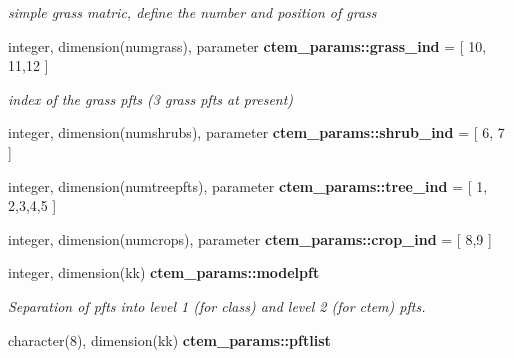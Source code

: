 \begin{DoxyCompactItemize}
\begin{DoxyCompactList}\small\item\em simple grass matric, define the number and position of grass \end{DoxyCompactList}\item 
\hypertarget{namespacectem__params_ac0e6330dd6b8408f75fb25c1a7aa7fcb}{}integer, dimension(numgrass), parameter {\bfseries ctem\+\_\+params\+::grass\+\_\+ind} = \mbox{[} 10, 11,12 \mbox{]}\label{namespacectem__params_ac0e6330dd6b8408f75fb25c1a7aa7fcb}

\begin{DoxyCompactList}\small\item\em index of the grass pfts (3 grass pfts at present) \end{DoxyCompactList}\item 
\hypertarget{namespacectem__params_aec72ba91dc7f74a089a1dfd41f940640}{}integer, dimension(numshrubs), parameter {\bfseries ctem\+\_\+params\+::shrub\+\_\+ind} = \mbox{[} 6, 7 \mbox{]}\label{namespacectem__params_aec72ba91dc7f74a089a1dfd41f940640}

\item 
\hypertarget{namespacectem__params_a0e1c44fcb6eedc488eba03f610e542dd}{}integer, dimension(numtreepfts), parameter {\bfseries ctem\+\_\+params\+::tree\+\_\+ind} = \mbox{[} 1, 2,3,4,5 \mbox{]}\label{namespacectem__params_a0e1c44fcb6eedc488eba03f610e542dd}

\item 
\hypertarget{namespacectem__params_acc6cbb656e34f04ef6d29df9e3418bb3}{}integer, dimension(numcrops), parameter {\bfseries ctem\+\_\+params\+::crop\+\_\+ind} = \mbox{[} 8,9 \mbox{]}\label{namespacectem__params_acc6cbb656e34f04ef6d29df9e3418bb3}

\item 
\hypertarget{namespacectem__params_a76e98194cd4666e7ca87bc867c1ba680}{}integer, dimension(kk) {\bfseries ctem\+\_\+params\+::modelpft}\label{namespacectem__params_a76e98194cd4666e7ca87bc867c1ba680}

\begin{DoxyCompactList}\small\item\em Separation of pfts into level 1 (for class) and level 2 (for ctem) pfts. \end{DoxyCompactList}\item 
\hypertarget{namespacectem__params_ac2d6dc08a8c0d805c01bebee4b7f3989}{}character(8), dimension(kk) {\bfseries ctem\+\_\+params\+::pftlist}\label{namespacectem__params_ac2d6dc08a8c0d805c01bebee4b7f3989}


\end{DoxyCompactItemize}
